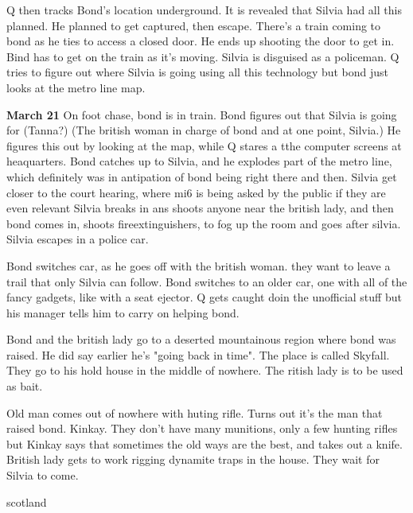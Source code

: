 \documentclass{article}
\begin{document}
    Q then tracks Bond's location underground. It is revealed that Silvia had all this planned. He planned to get
    captured, then escape. There's a train coming to bond as he ties to access a closed door. He ends up shooting the door
    to get in. Bind has to get on the train as it's moving. Silvia is disguised as a policeman. Q tries to figure out where
    Silvia is going using all this technology but bond just looks at the metro line map.


    \textbf{March 21}
    On foot chase, bond is in train. Bond figures out that Silvia is going for (Tanna?)
    (The british woman in charge of bond and at one point, Silvia.) He figures this out
    by looking at the map, while Q stares a tthe computer screens at heaquarters.
    Bond catches up to Silvia, and he explodes part of the metro line, which
    definitely was in antipation of bond being right there and then. Silvia get closer
    to the court hearing, where mi6 is being asked by the public if they are even relevant
    Silvia breaks in ans shoots anyone near the british lady, and then bond comes in,
    shoots fireextinguishers, to fog up the room and goes after silvia. Silvia escapes in a
    police car.

    Bond switches car, as he goes off with the british woman. they
    want to leave a trail that only Silvia can follow. Bond switches to
    an older car, one with all of the fancy gadgets, like with a seat ejector.
    Q gets caught doin the unofficial stuff but his manager tells him to carry on
    helping bond.

    Bond and the british lady go to a deserted mountainous region where bond was raised.
    He did say earlier he's "going back in time". The place is called Skyfall.
    They go to his hold house in the middle of nowhere. The ritish lady is to be used
    as bait.

    Old man comes out of nowhere with huting rifle. Turns out it's the man that raised bond.
    Kinkay. They don't have many munitions, only a few hunting rifles but Kinkay says that sometimes the old
    ways are the best, and takes out a knife.
    British lady gets to work rigging dynamite traps in the house.
    They wait for Silvia to come.

    scotland
\end{document}
